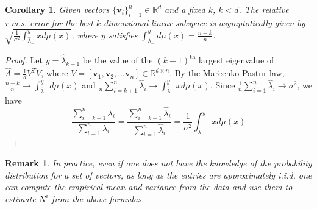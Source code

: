 \documentclass[11pt]{amsart}
\newtheorem{remark}{Remark}[section]
\newtheorem{corollary}[theorem]{Corollary}
\newcommand{\bv}{\mathbf{v}}
\begin{document}
\begin{corollary}\label{co:cor1}   Given vectors $\{ \bv_i\}_{i=1}^n \in \mathbb R^d$ and a fixed $k$, $k<d$.  The relative r.m.s. error for the best $k$ dimensional linear subspace is asymptotically given by $\sqrt{\frac{1}{\sigma^2} \int_{\hat{\lambda}_-}^y x d\mu(x) }$, where $y$ satisfies $\int_{\hat{\lambda}_-}^y d\mu(x) = \frac{n-k}{n}$. 
\end{corollary}
\begin{proof}
Let $y = \hat{\lambda}_{k+1}$ be the value of the $(k+1)^\text{th}$ largest eigenvalue of $\hat{A} = \frac{1}{d}V^TV$, where $V = [\bv_1, \bv_2, ... \bv_n] \in \mathbb R^{d\times n}$.  By the Mar$\check{\text{c}}$enko-Pastur law, $\frac{n-k}{n}\rightarrow \int_{\hat{\lambda}_-}^y d\mu(x) $ and 
$\frac{1}{n} \sum_{i=k+1}^n \hat{\lambda}_i \rightarrow \int_{\hat{\lambda}_-}^{y} x d\mu(x)$. Since $\frac{1}{n} \sum_{i=1}^n \hat{\lambda}_i \rightarrow \sigma^2$, we have 
\[
\frac{ \sum_{i=k+1}^n \lambda_i}{ \sum_{i=1}^n \lambda_i}=\frac{ \sum_{i=k+1}^n \hat{\lambda}_i}{ \sum_{i=1}^n \hat{\lambda}_i}=
\frac{1}{\sigma^2} \int_{\hat{\lambda}_-}^y x d\mu(x) 
\]

\end{proof}

\begin{remark}
In practice,  even if one does not have the knowledge of the probability distribution for a set of vectors, as long as the entries are approximately i.i.d, one can compute the empirical mean and variance from the data and use them to estimate $\underline{N}^{\epsilon}$ from the above formulas.
\end{remark}
\end{document}

